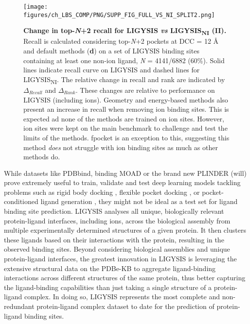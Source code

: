 \begin{figure}[htb!]
    \centering
    \texttt{[image: figures/ch\_LBS\_COMP/PNG/SUPP\_FIG\_FULL\_VS\_NI\_SPLIT2.png]}
   \caption[Change in top-\textit{N}+2 recall for LIGYSIS \textit{vs} LIGYSIS\textsubscript{NI} (II)]{\textbf{Change in top-\textit{N}+2 recall for LIGYSIS \textit{vs} LIGYSIS\textsubscript{NI} (II).} Recall is calculated considering top-\textit{N}+2 pockets at DCC = 12 \AA{} and default methods (\textbf{d}) on a set of LIGYSIS binding sites containing at least one non-ion ligand, \textit{N} = 4141/6882 (60\%). Solid lines indicate recall curve on LIGYSIS and dashed lines for LIGYSIS\textsubscript{NI}. The relative change in recall and rank are indicated by $\Delta_{Recall}$ and $\Delta_{Rank}$. These changes are relative to performance on LIGYSIS (including ions). Geometry and energy-based methods also present an increase in recall when removing ion binding sites. This is expected ad none of the methods are trained on ion sites. However, ion sites were kept on the main benchmark to challenge and test the limits of the methods. fpocket is an exception to this, suggesting this method \textit{does} not struggle with ion binding sites as much as other methods do.}
    \label{fig:LIGYSIS_VS_LIGYSISNI_2}
\end{figure}

While datasets like PDBbind, binding MOAD or the brand new PLINDER \cite{DURAIRAJ_2024_PLINDER} (will) prove extremely useful to train, validate and test deep learning models tackling problems such as rigid body docking \cite{STARK_2022_EQUIBIND}, flexible pocket docking \cite{QIAO_2024_DGN}, or pocket-conditioned ligand generation \cite{SCHNEUING_2023_DIFFUSION}, they might not be ideal as a test set for ligand binding site prediction. LIGYSIS analyses all unique, biologically relevant protein-ligand interfaces, including ions, across the biological assembly from multiple experimentally determined structures of a given protein. It then clusters these ligands based on their interactions with the protein, resulting in the observed binding sites. Beyond considering biological assemblies and unique protein-ligand interfaces, the greatest innovation in LIGYSIS is leveraging the extensive structural data on the PDBe-KB to aggregate ligand-binding interactions across different structures of the same protein, thus better capturing the ligand-binding capabilities than just taking a single structure of a protein-ligand complex. In doing so, LIGYSIS represents the most complete and non-redundant protein-ligand complex dataset to date for the prediction of protein-ligand binding sites.

